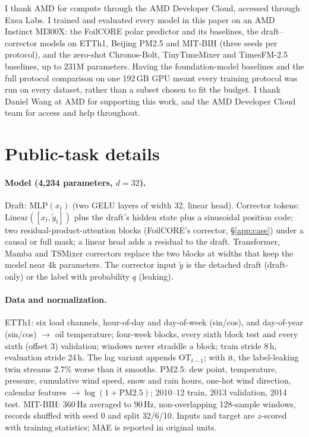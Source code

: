 \documentclass{article}
\begin{document}
\begin{ack}
I thank AMD for compute through the AMD Developer Cloud, accessed through Exea Labs. I trained and evaluated every model in this paper on an AMD Instinct MI300X: the FoilCORE polar predictor and its baselines, the draft--corrector models on ETTh1, Beijing PM2.5 and MIT-BIH (three seeds per protocol), and the zero-shot Chronos-Bolt, TinyTimeMixer and TimesFM-2.5 baselines, up to 231M parameters. Having the foundation-model baselines and the full protocol comparison on one 192\,GB GPU meant every training protocol was run on every dataset, rather than a subset chosen to fit the budget. I thank Daniel Wang at AMD for supporting this work, and the AMD Developer Cloud team for access and help throughout.
\end{ack}



\appendix
\section{Public-task details}
\label{app:transfer}
\paragraph{Model (4,234 parameters, $d{=}32$).} Draft: $\mathrm{MLP}(x_t)$ (two GELU layers of width 32, linear head). Corrector tokens: $\mathrm{Linear}([x_t,\tilde y_t])$ plus the draft's hidden state plus a sinusoidal position code; two residual-product-attention blocks (FoilCORE's corrector, \S\ref{app:case}) under a causal or full mask; a linear head adds a residual to the draft. Transformer, Mamba and TSMixer correctors replace the two blocks at widths that keep the model near 4k parameters. The corrector input $\tilde y$ is the detached draft (draft-only) or the label with probability $q$ (leaking).
\paragraph{Data and normalization.} ETTh1: six load channels, hour-of-day and day-of-week (sin/cos), and day-of-year (sin/cos) $\rightarrow$ oil temperature; four-week blocks, every sixth block test and every sixth (offset 3) validation; windows never straddle a block; train stride 8\,h, evaluation stride 24\,h. The lag variant appends $\mathrm{OT}_{t-1}$; with it, the label-leaking twin streams 2.7\% worse than it smooths. PM2.5: dew point, temperature, pressure, cumulative wind speed, snow and rain hours, one-hot wind direction, calendar features $\rightarrow\log(1{+}\mathrm{PM2.5})$; 2010--12 train, 2013 validation, 2014 test. MIT-BIH: 360\,Hz averaged to 90\,Hz, non-overlapping 128-sample windows, records shuffled with seed 0 and split 32/6/10. Inputs and target are $z$-scored with training statistics; MAE is reported in original units.
\end{document}
